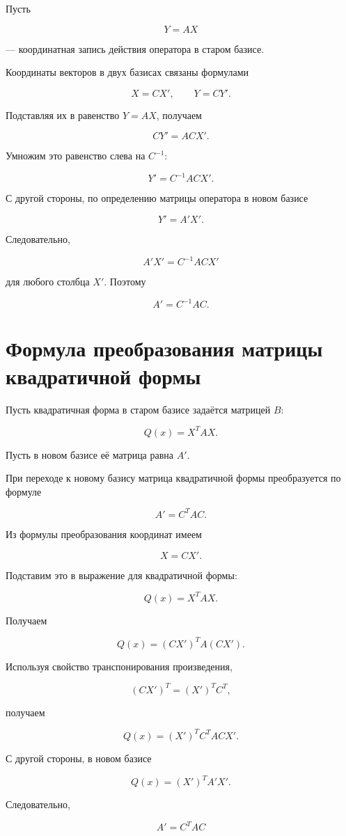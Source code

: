 \documentclass[14pt]{extreport}
\begin{document}
    \begin{prbox}
        Пусть

\[
Y=AX
\]

— координатная запись действия оператора в старом базисе.

Координаты векторов в двух базисах связаны формулами

\[
X=CX',
\qquad
Y=CY'.
\]

Подставляя их в равенство \(Y=AX\), получаем

\[
CY'=ACX'.
\]

Умножим это равенство слева на \(C^{-1}\):

\[
Y'=C^{-1}ACX'.
\]

С другой стороны, по определению матрицы оператора в новом базисе

\[
Y'=A'X'.
\]

Следовательно,

\[
A'X'=C^{-1}ACX'
\]

для любого столбца \(X'\). Поэтому

\[
\boxed{A'=C^{-1}AC.}
\]

    \end{prbox}

    \section{Формула преобразования матрицы квадратичной формы}
    Пусть квадратичная форма в старом базисе задаётся матрицей \(B\):

\[
Q(x)=X^{T}AX.
\]

Пусть в новом базисе её матрица равна \(A'\).
    \begin{thbox}

При переходе к новому базису матрица квадратичной формы преобразуется по формуле

\[
A'=C^{T}AC.
\]
    \end{thbox}
    \begin{prbox}
        Из формулы преобразования координат имеем

\[
X=CX'.
\]

Подставим это в выражение для квадратичной формы:

\[
Q(x)=X^{T}AX.
\]

Получаем

\[
Q(x)
=
(CX')^{T}A(CX').
\]

Используя свойство транспонирования произведения,

\[
(CX')^{T}=(X')^{T}C^{T},
\]

получаем

\[
Q(x)
=
(X')^{T}C^{T}ACX'.
\]

С другой стороны, в новом базисе

\[
Q(x)=(X')^{T}A'X'.
\]

Следовательно,

\[
\boxed{A'=C^{T}AC}
\]

    \end{prbox}
\end{document}
